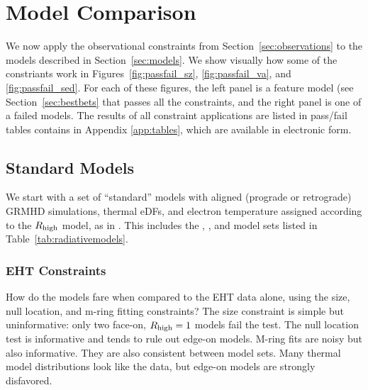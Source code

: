 \section{Model Comparison}\label{sec:comparisons}

We now apply the observational constraints from
Section~\ref{sec:observations} to the models described in
Section~\ref{sec:models}.
We show visually how some of the constriants work in
Figures~\ref{fig:passfail_sz}, \ref{fig:passfail_va}, and
\ref{fig:passfail_sed}.
For each of these figures, the left panel is a feature model (see
Section~\ref{sec:bestbets} that passes all the constraints, and the
right panel is one of a failed models.
The results of all constraint applications are listed in pass/fail
tables contains in Appendix \ref{app:tables}, which are available in
electronic form.

\subsection{Standard Models}\label{subsec:thermal}


We start with a set of ``standard'' models with aligned (prograde or retrograde) GRMHD simulations, thermal eDFs, and electron temperature assigned according to the $R_\mathrm{high}$ model, as in .  This includes the \kharma, \bhac, and \hamr model sets listed in Table~\ref{tab:radiativemodels}.

\subsubsection{EHT Constraints}

How do the models fare when compared to the EHT data alone, using the size, null location, and m-ring fitting constraints?  The size constraint is simple but uninformative: only two face-on, $R_\mathrm{high} = 1$ models fail the test.  The null location test is informative and tends to rule out edge-on models.  M-ring fits are noisy but also informative.  They are also consistent between model sets.  Many thermal model distributions look like the data, but edge-on models are strongly disfavored.


